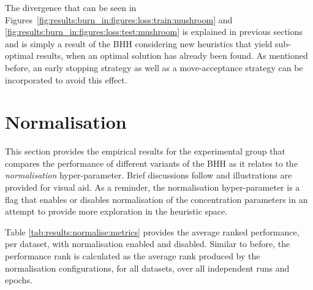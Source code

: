 The divergence that can be seen in Figures~\ref{fig:results:burn_in:figures:loss:train:mushroom} and \ref{fig:results:burn_in:figures:loss:test:mushroom} is explained in previous sections and is simply a result of the \acs{BHH} considering new heuristics that yield sub-optimal results, when an optimal solution has already been found. As mentioned before, an early stopping strategy as well as a move-acceptance strategy can be incorporated to avoid this effect.

\section{Normalisation}\label{sec:results:normalise}

This section provides the empirical results for the experimental group that compares the performance of different variants of the \acs{BHH} as it relates to the \textit{normalisation} hyper-parameter. Brief discussions follow and illustrations are provided for visual aid. As a reminder, the normalisation hyper-parameter is a flag that enables or disables normalisation of the concentration parameters in an attempt to provide more exploration in the heuristic space.

Table \ref{tab:results:normalise:metrics} provides the average ranked performance, per dataset, with normalisation enabled and disabled. Similar to before, the performance rank is calculated as the average rank produced by the normalisation configurations, for all datasets, over all independent runs and epochs.

